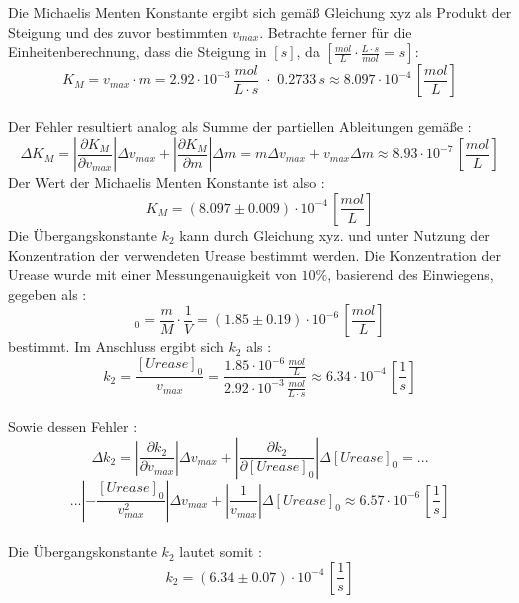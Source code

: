 Die Michaelis Menten Konstante ergibt sich gemäß Gleichung xyz als Produkt der Steigung und des zuvor bestimmten $v_{max}$. Betrachte ferner für die Einheitenberechnung, dass die Steigung in $  [\si{s}]$, da $ [\si{\frac{mol}{L}\cdot \frac{L\cdot s}{mol} = s}]$: 
\begin{equation}
K_M = v_{max} \cdot m = 2.92 \cdot 10^{-3} \, \si{\frac{mol}{L\cdot s}}\,\, \cdot \,\,0.2733  \,\si{s} \approx 8.097 \cdot 10^{-4} \, [\si{\frac{mol}{L}}]
\end{equation}\\
Der Fehler resultiert analog als Summe der partiellen Ableitungen gemäße : 
\begin{equation}
\Delta K_M = |\frac{\partial K_M}{\partial v_{max}}|\Delta v_{max} + |\frac{\partial K_M}{\partial m}|\Delta m  = m \Delta v_{max} + v_{max}\Delta m \approx 8.93 \cdot 10^{-7} \,[\si{\frac{mol}{L}}]
\end{equation}
Der Wert der Michaelis Menten Konstante ist also : 
\begin{equation}
K_M = (8.097 \pm 0.009) \cdot 10^{-4} \,[\si{\frac{mol}{L}}]
\end{equation}
Die Übergangskonstante $k_2$ kann durch Gleichung xyz. und unter Nutzung der Konzentration der verwendeten Urease bestimmt werden. Die Konzentration der Urease wurde mit einer Messungenauigkeit von $10\%$, basierend des  Einwiegens, gegeben als :
\begin{equation}
[Urease]_0 = \frac{m}{M}\cdot \frac{1}{V} =  (1.85 \pm 0.19)\cdot 10^{-6} \,\left[\si{\frac{mol}{L}}\right]
\end{equation} 
bestimmt. Im Anschluss ergibt sich $k_2$ als : 
\begin{equation}
k_2 = \frac{[Urease]_0}{v_{max}} = \frac{1.85 \cdot 10^{-6} \, \si{\frac{mol}{L}}}{2.92\cdot 10^{-3}\, \si{\frac{mol}{L\cdot s}}} \approx 6.34 \cdot 10^{-4} \, \left[\si{\frac{1}{s}}\right]
\end{equation}
\\
Sowie dessen Fehler : 
\begin{equation}
\Delta k_2 = \left|\frac{\partial k_2}{\partial v_{max}}\right|\Delta v_{max} + \left|\frac{\partial k_2}{\partial [Urease]_0}\right|\Delta [Urease]_0  = ...
\end{equation}
\begin{equation*}
... \left|-\frac{[Urease]_0}{v_{max}^2}\right| \Delta v_{max} + \left|\frac{1}{v_{max}}\right|\Delta [Urease]_0 \approx 6.57 \cdot 10^{-6} \,\left[\si{\frac{1}{s}}\right]
\end{equation*}
\\
Die Übergangskonstante $k_2$ lautet somit : 
\begin{equation}
k_2 = (6.34 \pm 0.07)\cdot 10^{-4}\,\left[\si{\frac{1}{s}}\right]
\end{equation}
%